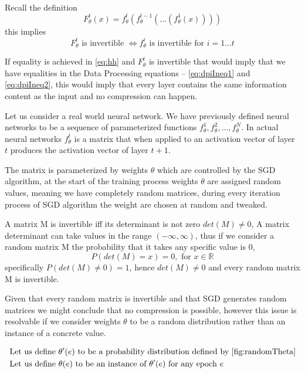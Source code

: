 Recall the definition
\begin{equation*}
  F_{\theta}^t(x) = f_{\theta}^t(f_{\theta}^{t-1}(...(f_{\theta}^1(x))))
\end{equation*}
this implies 
\begin{equation*}
  F_\theta^t \text{ is invertible } \Leftrightarrow f_\theta^i 
  \text{ is invertible for } i = 1...t
\end{equation*}

If equality is achieved in \autoref{eq:hh} and $F_\theta^t$ is invertible that
would imply that we have equalities in the Data Processing equations --
\autoref{eq:dpiIneq1} and \autoref{eq:dpiIneq2}, this would imply that every
layer contains the same information content as the input and no compression can
happen.

Let us consider a real world neural network. We have previously defined neural
networks to be a sequence of parameterized functions
$f_{\theta}^1, f_{\theta}^2, ...  ,f_{\theta}^N$. In actual neural networks
$f_\theta^t$ is a matrix that when applied to an activation vector of layer $t$
produces the activation vector of layer $t+1$. 

The matrix is parameterized by weights $\theta$ which are controlled by the SGD
algorithm, at the start of the training process weights $\theta$ are assigned
random values, meaning we have completely random matrices, during every
iteration process of SGD algorithm the weight are chosen at random and
tweaked.

A matrix M is invertible iff its determinant is not zero $det(M) \neq 0$, A
matrix determinant can take values in the range $(-\infty, \infty)$, thus if we
consider a random matrix M the probability that it takes any specific value is
0, 
\begin{equation*}
  P(det(M) = x) = 0, \text{ for } x \in \mathbb{R}
\end{equation*}
specifically $P(det(M) \neq 0) = 1$, hence $det(M) \neq 0$ and every random
matrix M is invertible.

Given that every random matrix is invertible and that SGD generates random
matrices we might conclude that no compression is possible, however this issue
is resolvable if we consider weights $\theta$ to be a random distribution rather
than an instance of a concrete value. 

\begin{align}
  &\text{Let us define } \theta^\prime(e) \text{ to be a probability distribution
  defined by \autoref{fig:randomTheta}} \label{def:thetaprime} \\
  &\text{Let us define } \theta(e) \text{ to be an instance of }
  \theta^\prime(e) \text{ for any epoch } e \label{def:theta}
\end{align}

